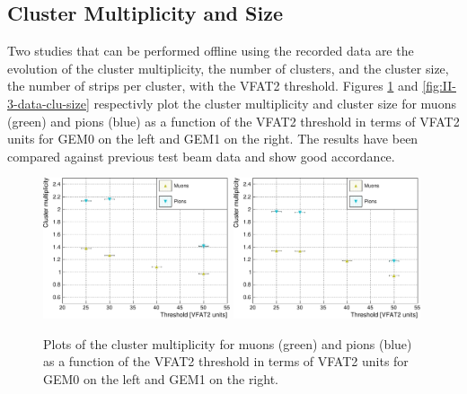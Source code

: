     \subsection{Cluster Multiplicity and Size}

      Two studies that can be performed offline using the recorded data are the evolution of the cluster multiplicity, the number of clusters, and the cluster size, the number of strips per cluster, with the VFAT2 threshold. Figures \ref{fig:II-3-data-clu-mult} and \ref{fig:II-3-data-clu-size} respectivly plot the cluster multiplicity and cluster size for muons (green) and pions (blue) as a function of the VFAT2 threshold in terms of VFAT2 units for GEM0 on the left and GEM1 on the right. The results have been compared against previous test beam data \cite{Abbaneo:1494965, Abbaneo:1401079} and show good accordance. \\

      \begin{figure}[h!]
        \centering
        \includegraphics[width=0.49\textwidth]{img/plots/cClusterMultiplicity_Threshold_GEM0-crop}
        \includegraphics[width=0.49\textwidth]{img/plots/cClusterMultiplicity_Threshold_GEM1-crop}
        \caption{Plots of the cluster multiplicity for muons (green) and pions (blue) as a function of the VFAT2 threshold in terms of VFAT2 units for GEM0 on the left and GEM1 on the right.}
        \label{fig:II-3-data-clu-mult}
      \end{figure}

